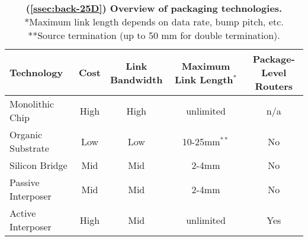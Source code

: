 \begin{table}[h]
\setlength{\tabcolsep}{3pt}
\centering
\captionsetup{justification=centering}
\begin{tabular}{lcccc}
\toprule
Technology & 
Cost & 
\makecell{Link\\Bandwidth} & 
\makecell{Maximum\\Link Length$^*$} &
\makecell{Package-Level\\Routers}
\vspace{-0.3em}\\
\midrule
Monolithic Chip		& High	& High	& unlimited						& n/a	\\
Organic Substrate 	& Low	& Low 	& 10-25mm$^{**}$ \cite{bow-spec}& No 	\\
Silicon Bridge		& Mid	& Mid	& 2-4mm	\cite{emib, sib-2}		& No 	\\
Passive Interposer 	& Mid	& Mid	& 2-4mm	\cite{bow-spec}			& No 	\\
Active Interposer 	& High	& Mid	& unlimited						& Yes	\\
\bottomrule
\end{tabular}
\vspace{-0.5em}
\caption{\textbf{(\textsection\ref{ssec:back-25D}) Overview of packaging technologies.} *Maximum link length depends on data rate, bump pitch, etc. **Source termination (up to 50 mm for double termination).}
\vspace{-2.5em}
\label{tab:back-chips}
\end{table}
